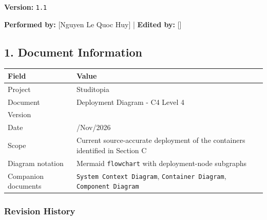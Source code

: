 \documentclass[12pt]{article}
\renewcommand{\baselinestretch}{1.5}
\begin{document}
\textbf{Version:} \texttt{1.1}
\par\medskip

\textbf{Performed by:} [Nguyen Le Quoc Huy] | \textbf{Edited by:} []
\par\medskip

\hypertarget{sec:1-document-information}{}
\subsection*{1. Document Information}
\par\medskip

\begingroup
\small
\renewcommand{\baselinestretch}{1.0}\selectfont
\renewcommand{\arraystretch}{1.15}
\setlength{\tabcolsep}{6pt}
\begin{longtable}{|>{\raggedright\arraybackslash}p{}|>{\raggedright\arraybackslash}p{}|}
\hline
\textbf{Field} & \textbf{Value} \\ \hline
\endhead
Project & Studitopia \\ \hline
Document & Deployment Diagram - C4 Level 4 \\ \hline
Version & 1.1 \\ \hline
Date & 28/Nov/2026 \\ \hline
Scope & Current source-accurate deployment of the containers identified in Section C \\ \hline
Diagram notation & Mermaid \texttt{flowchart} with deployment-node subgraphs \\ \hline
Companion documents & \texttt{System Context Diagram}, \texttt{Container Diagram}, \texttt{Component Diagram} \\ \hline
\end{longtable}
\endgroup
\par\medskip

\hypertarget{sec:revision-history}{}
\subsubsection*{Revision History}
\par\medskip
\end{document}
